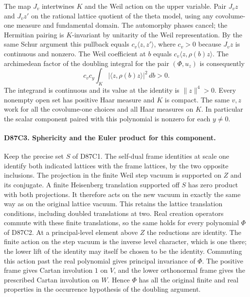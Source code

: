 The map $J_v$ intertwines $K$ and the Weil action on the upper
variable. Pair $J_vz$ and $J_vz'$ on the rational lattice quotient
of the theta model, using any covolume-one measure and fundamental
domain. The automorphy phases cancel; the Hermitian pairing is
$K$-invariant by unitarity of the Weil representation. By the
same Schur argument this pullback equals $c_v\langle z,z'\rangle$,
where $c_v>0$ because $J_vz$ is continuous and nonzero. The
Weil coefficient at $b$ equals $c_v\langle z,\rho(b)z\rangle$.
The archimedean factor of the doubling integral for the pair
$(\Phi,u_z)$ is consequently
\[
  c_v c_y \int_K |\langle z,\rho(b)z\rangle|^2\,db>0 .
\]
The integrand is continuous and its value at the identity is
$\|z\|^4>0$. Every nonempty open set has positive Haar measure
and $K$ is compact. The same $v,z$ work for all the covolume-one
choices and all Haar measures on $K$. In particular the scalar
component paired with this polynomial is nonzero for each $y\ne0$.

\paragraph{D87C3. Sphericity and the Euler product for this component.}
Keep the precise set $S$ of D87C1. The self-dual frame identities
at scale one identify both indicated lattices with the frame
lattices, by the two opposite inclusions. The projection in the
finite Weil step vacuum is supported on $Z$ and its conjugate.
A finite Heisenberg translation supported off $S$ has zero product
with both projections. It therefore acts on the new vacuum in
exactly the same way as on the original lattice vacuum. This
retains the lattice translation conditions, including doubled
translations at two. Real creation operators commute with these
finite translations, so the same holds for every polynomial
$\Phi$ of D87C2. At a principal-level element above $Z$ the
reductions are identity. The finite action on the step vacuum is
the inverse level character, which is one there; the lower lift
of the identity may itself be chosen to be the identity.
Commuting this action past the real polynomial gives principal
invariance of $\Phi$. The positive frame gives Cartan involution
$1$ on $V$, and the lower orthonormal frame gives the prescribed
Cartan involution on $W$. Hence $\Phi$ has all the original
finite and real properties in the occurrence hypothesis of the
doubling argument.

